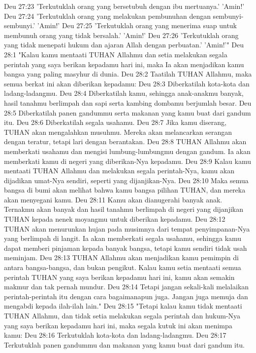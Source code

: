 Deu 27:23  'Terkutuklah orang yang bersetubuh dengan ibu mertuanya.' 'Amin!'
Deu 27:24  'Terkutuklah orang yang melakukan pembunuhan dengan sembunyi-sembunyi.' 'Amin!'
Deu 27:25  'Terkutuklah orang yang menerima suap untuk membunuh orang yang tidak bersalah.' 'Amin!'
Deu 27:26  'Terkutuklah orang yang tidak menepati hukum dan ajaran Allah dengan perbuatan.' 'Amin!'"
Deu 28:1  "Kalau kamu mentaati TUHAN Allahmu dan setia melakukan segala perintah yang saya berikan kepadamu hari ini, maka Ia akan menjadikan kamu bangsa yang paling masyhur di dunia.
Deu 28:2  Taatilah TUHAN Allahmu, maka semua berkat ini akan diberikan kepadamu:
Deu 28:3  Diberkatilah kota-kota dan ladang-ladangmu.
Deu 28:4  Diberkatilah kamu, sehingga anak-anakmu banyak, hasil tanahmu berlimpah dan sapi serta kambing dombamu berjumlah besar.
Deu 28:5  Diberkatilah panen gandummu serta makanan yang kamu buat dari gandum itu.
Deu 28:6  Diberkatilah segala usahamu.
Deu 28:7  Jika kamu diserang, TUHAN akan mengalahkan musuhmu. Mereka akan melancarkan serangan dengan teratur, tetapi lari dengan berantakan.
Deu 28:8  TUHAN Allahmu akan memberkati usahamu dan mengisi lumbung-lumbungmu dengan gandum. Ia akan memberkati kamu di negeri yang diberikan-Nya kepadamu.
Deu 28:9  Kalau kamu mentaati TUHAN Allahmu dan melakukan segala perintah-Nya, kamu akan dijadikan umat-Nya sendiri, seperti yang dijanjikan-Nya.
Deu 28:10  Maka semua bangsa di bumi akan melihat bahwa kamu bangsa pilihan TUHAN, dan mereka akan menyegani kamu.
Deu 28:11  Kamu akan dianugerahi banyak anak. Ternakmu akan banyak dan hasil tanahmu berlimpah di negeri yang dijanjikan TUHAN kepada nenek moyangmu untuk diberikan kepadamu.
Deu 28:12  TUHAN akan menurunkan hujan pada musimnya dari tempat penyimpanan-Nya yang berlimpah di langit. Ia akan memberkati segala usahamu, sehingga kamu dapat memberi pinjaman kepada banyak bangsa, tetapi kamu sendiri tidak usah meminjam.
Deu 28:13  TUHAN Allahmu akan menjadikan kamu pemimpin di antara bangsa-bangsa, dan bukan pengikut. Kalau kamu setia mentaati semua perintah TUHAN yang saya berikan kepadamu hari ini, kamu akan semakin makmur dan tak pernah mundur.
Deu 28:14  Tetapi jangan sekali-kali melalaikan perintah-perintah itu dengan cara bagaimanapun juga. Jangan juga memuja dan mengabdi kepada ilah-ilah lain."
Deu 28:15  "Tetapi kalau kamu tidak mentaati TUHAN Allahmu, dan tidak setia melakukan segala perintah dan hukum-Nya yang saya berikan kepadamu hari ini, maka segala kutuk ini akan menimpa kamu:
Deu 28:16  Terkutuklah kota-kota dan ladang-ladangmu.
Deu 28:17  Terkutuklah panen gandummu dan makanan yang kamu buat dari gandum itu.
